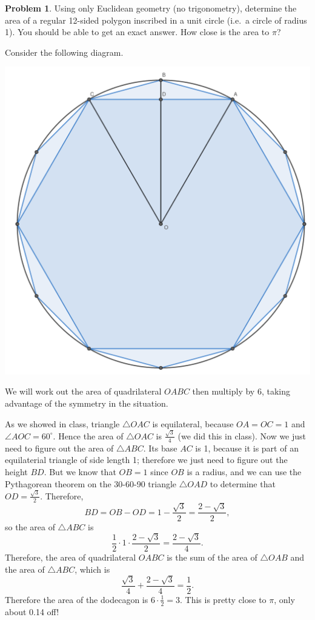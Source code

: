 \documentclass[11pt,oneside]{amsart}
\theoremstyle{definition}
\newtheorem{problem}{Problem}
\begin{document}
    \begin{problem}
        Using only Euclidean geometry (no trigonometry), determine the area of a regular 12-sided polygon inscribed in a unit circle (i.e.\ a circle of radius 1). You should be able to get an exact answer. How close is the area to $\pi$?
    \end{problem}
    \begin{solution}
        Consider the following diagram.
        \begin{center}
        \includegraphics[width=0.7\linewidth]{dodecahedron.pdf}
        \end{center}
        We will work out the area of quadrilateral $OABC$ then multiply by 6, taking advantage of the symmetry in the situation.

        As we showed in class, triangle $\triangle OAC$ is equilateral, because $OA=OC=1$ and $\angle AOC=60^\circ$. Hence the area of $\triangle OAC$ is $\frac{\sqrt 3}4$ (we did this in class). Now we just need to figure out the area of $\triangle ABC$. Its base $AC$ is 1, because it is part of an equilaterial triangle of side length 1; therefore we just need to figure out the height $BD$. But we know that $OB=1$ since $OB$ is a radius, and we can use the Pythagorean theorem on the 30-60-90 triangle $\triangle OAD$ to determine that $OD=\frac{\sqrt 3}2$. Therefore,
        \[BD=OB-OD=1-\frac{\sqrt 3}2=\frac{2-\sqrt3}2,\]
        so the area of $\triangle ABC$ is
        \[\frac 12\cdot 1\cdot \frac{2-\sqrt3}2=\frac{2-\sqrt3}4.\]
        Therefore, the area of quadrilateral $OABC$ is the sum of the area of $\triangle OAB$ and the area of $\triangle ABC$, which is
        \[\frac{\sqrt3}4+\frac{2-\sqrt3}4=\frac12.\]
        Therefore the area of the dodecagon is $6\cdot\frac12=3$. This is pretty close to $\pi$, only about 0.14 off!
    \end{solution}
\end{document}
